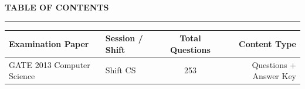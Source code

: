 \documentclass[a4paper,10pt,twoside]{article}
\begin{document}
\newpage

\begin{center}
    {\Large\textbf{TABLE OF CONTENTS}}\\[0.4em]
    \rule{0.5\textwidth}{0.6pt}
\end{center}
\vspace{1em}

\noindent\begin{tabularx}{\linewidth}{|X|l|c|r|}
\hline
\textbf{Examination Paper} & \textbf{Session / Shift} & \textbf{Total Questions} & \textbf{Content Type} \\
\hline

GATE 2013 Computer Science & Shift CS & 253 & Questions + Answer Key \\ \hline
\end{tabularx}

\vspace{1.5em}

\newpage
\end{document}

